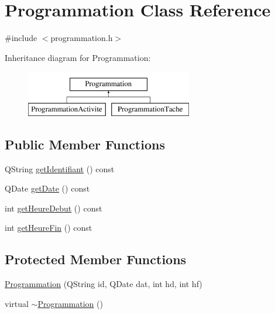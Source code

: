 \hypertarget{class_programmation}{}\section{Programmation Class Reference}
\label{class_programmation}


{\ttfamily \#include $<$programmation.\+h$>$}

Inheritance diagram for Programmation\+:\begin{figure}[H]
\begin{center}
\leavevmode
\includegraphics[height=2.000000cm]{class_programmation}
\end{center}
\end{figure}
\subsection*{Public Member Functions}
\begin{DoxyCompactItemize}
\item 
Q\+String \hyperlink{class_programmation_a37380f79c4235bfedcbab7c2b9c5de5c}{get\+Identifiant} () const 
\item 
Q\+Date \hyperlink{class_programmation_abd1632dfa907a6bf2a84bfdbc3bef38f}{get\+Date} () const 
\item 
int \hyperlink{class_programmation_a927a5f9c0c752d33d12eb100b9315055}{get\+Heure\+Debut} () const 
\item 
int \hyperlink{class_programmation_a8ebc1580f9e4a3a3317d4a5535e28d8b}{get\+Heure\+Fin} () const 
\end{DoxyCompactItemize}
\subsection*{Protected Member Functions}
\begin{DoxyCompactItemize}
\item 
\hyperlink{class_programmation_a73e7d51291b37140ffb7647bfa0d5ff3}{Programmation} (Q\+String id, Q\+Date dat, int hd, int hf)
\item 
virtual \hyperlink{class_programmation_aa477667deb545f10a3f5d32d7a3df590}{$\sim$\+Programmation} ()
\end{DoxyCompactItemize}
